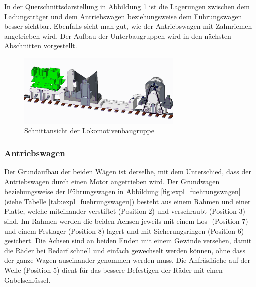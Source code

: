 \documentclass[../../main.tex]{subfiles}
\begin{document}
    In der Querschnittsdarstellung in Abbildung \ref{fig:schnitt_lokomotive} ist die Lagerungen zwischen dem Ladungsträger und dem Antriebswagen beziehungsweise dem Führungswagen besser sichtbar. Ebenfalls sieht man gut, wie der Antriebswagen mit Zahnriemen angetrieben wird. Der Aufbau der Unterbaugruppen wird in den nächsten Abschnitten vorgestellt.\\
   
    \begin{figure}[H] %
        \centering
        \includegraphics[width=0.7\textwidth]{lokomotive_2.png}
        \caption{Schnittansicht der Lokomotivenbaugruppe}
        \label{fig:schnitt_lokomotive}
    \end{figure}
    \newpage

    \subsubsection{Antriebswagen}
    Der Grundaufbau der beiden Wägen ist derselbe, mit dem Unterschied, dass der Antriebswagen durch einen Motor angetrieben wird. Der Grundwagen beziehungsweise der Führungswagen in Abbildung \ref{fig:expl_fuehrungswagen} (siehe Tabelle \ref{tab:expl_fuehrungswagen}) besteht aus einem Rahmen und einer Platte, welche miteinander verstiftet (Position 2) und verschraubt (Position 3) sind. Im Rahmen werden die beiden Achsen jeweils mit einem Los- (Position 7) und einem Festlager (Position 8) lagert und mit Sicherungsringen (Position 6) gesichert. Die Achsen sind an beiden Enden mit einem Gewinde versehen, damit die Räder bei Bedarf schnell und einfach gewechselt werden können, ohne dass der ganze Wagen auseinander genommen werden muss. Die Anfräsfläche auf der Welle (Position 5) dient für das bessere Befestigen der Räder mit einen Gabelschlüssel.\\
\end{document}
